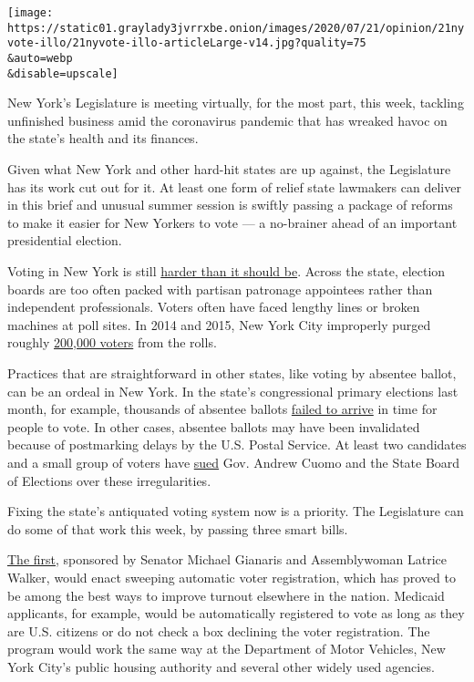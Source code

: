 \texttt{[image: https://static01.graylady3jvrrxbe.onion/images/2020/07/21/opinion/21nyvote-illo/21nyvote-illo-articleLarge-v14.jpg?quality=75\\\&auto=webp\\\&disable=upscale]}

New York's Legislature is meeting virtually, for the most part, this
week, tackling unfinished business amid the coronavirus pandemic that
has wreaked havoc on the state's health and its finances.

Given what New York and other hard-hit states are up against, the
Legislature has its work cut out for it. At least one form of relief
state lawmakers can deliver in this brief and unusual summer session is
swiftly passing a package of reforms to make it easier for New Yorkers
to vote --- a no-brainer ahead of an important presidential election.

Voting in New York is still
\href{https://www.nytimes3xbfgragh.onion/2019/10/15/opinion/new-york-ranked-choice-voting.html}{harder
than it should be}. Across the state, election boards are too often
packed with partisan patronage appointees rather than independent
professionals. Voters often have faced lengthy lines or broken machines
at poll sites. In 2014 and 2015, New York City improperly purged roughly
\href{https://www.vox.com/2018/9/13/17855254/new-york-city-voters-rolls-purges-missing-names-2018-midterms}{200,000
voters} from the rolls.

Practices that are straightforward in other states, like voting by
absentee ballot, can be an ordeal in New York. In the state's
congressional primary elections last month, for example, thousands of
absentee ballots
\href{https://www.nytimes3xbfgragh.onion/2020/06/23/nyregion/voting-nyc-primary.html}{failed
to arrive} in time for people to vote. In other cases, absentee ballots
may have been invalidated because of postmarking delays by the U.S.
Postal Service. At least two candidates and a small group of voters have
\href{https://gothamist.com/news/cuomo-board-elections-sued-disenfranchising-thousands-voters-over-postmark-problems-absentee-ballots}{sued}
Gov. Andrew Cuomo and the State Board of Elections over these
irregularities.

Fixing the state's antiquated voting system now is a priority. The
Legislature can do some of that work this week, by passing three smart
bills.

\href{https://www.nysenate.gov/legislation/bills/2019/s8806}{The first},
sponsored by Senator Michael Gianaris and Assemblywoman Latrice Walker,
would enact sweeping automatic voter registration, which has proved to
be among the best ways to improve turnout elsewhere in the nation.
Medicaid applicants, for example, would be automatically registered to
vote as long as they are U.S. citizens or do not check a box declining
the voter registration. The program would work the same way at the
Department of Motor Vehicles, New York City's public housing authority
and several other widely used agencies.

